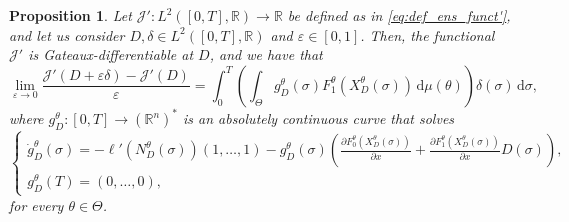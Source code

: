 \documentclass[a4paper,12pt, reqno]{amsart}
\theoremstyle{plain}
\newtheorem{proposition}[theorem]{Proposition}
\theoremstyle{definition}
\theoremstyle{remark}
\numberwithin{equation}{section}
\newcommand{\J}{\mathcal{J}}
\newcommand{\R}{\mathbb{R}}
\newcommand{\e}{\varepsilon}
\newcommand{\de}{\,\mathrm{d}}
\begin{document}
\begin{proposition} \label{prop:grad_rep}
    Let ${\J'\colon L^2([0,T],\R)\to \R}$ be defined as in \cref{eq:def_ens_funct'}, and let us consider ${D,\delta}\in L^2([0,T],\R)$ and $\e\in [0,1]$.
    Then, the functional $\J'$ is Gateaux-differentiable at ${D}$, and we have that
    \begin{equation} \label{eq:grad_rep}
        \lim_{\e \to 0} \frac{\J'({D}+\e {\delta})- \J'({D})}{\e} =
        \int_0^T  
         \left( \int_\Theta
         {g_D^\theta}(\sigma) 
         F_1^\theta \left( {X_D^\theta}(\sigma) \right)
         \de \mu(\theta)
         \right)
         {\delta}(\sigma)
         \de \sigma,
    \end{equation}
    where ${g_D^\theta}\colon [0,T]\to (\R^{n})^*$ is an absolutely continuous curve that solves
    \begin{equation} \label{eq:grad_back_ode}
        \begin{cases}
             {\dot g_D^\theta} (\sigma) = 
            -\ell' \left({N_D^\theta}(\sigma) \right) (1,{\ldots,}1) -{g_D^\theta}(\sigma) \left( \frac{\partial F_0^\theta ({X_D^\theta}(\sigma))}{\partial x} +
    \frac{\partial F_1^\theta ({X_D^\theta}(\sigma))}{\partial x} {D}(\sigma) \right),\\
        {g_D^\theta} (T) = (0,{\ldots,}0),
        \end{cases}
    \end{equation}
    for every $\theta\in\Theta$.
\end{proposition}
\end{document}
